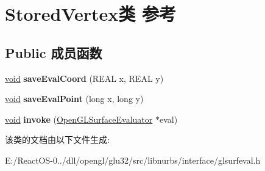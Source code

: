 \hypertarget{class_stored_vertex}{}\section{Stored\+Vertex类 参考}
\label{class_stored_vertex}
\subsection*{Public 成员函数}
\begin{DoxyCompactItemize}
\item 
\mbox{\label{class_stored_vertex_a4041ab67ea70028dae311420c815e690}} 
\hyperlink{interfacevoid}{void} {\bfseries save\+Eval\+Coord} (R\+E\+AL x, R\+E\+AL y)
\item 
\mbox{\label{class_stored_vertex_a0db109a8ccd253a81cfe3cb56f96ab84}} 
\hyperlink{interfacevoid}{void} {\bfseries save\+Eval\+Point} (long x, long y)
\item 
\mbox{\label{class_stored_vertex_a108ed4863a7151ee1ff4e58fa0504f31}} 
\hyperlink{interfacevoid}{void} {\bfseries invoke} (\hyperlink{class_open_g_l_surface_evaluator}{Open\+G\+L\+Surface\+Evaluator} $\ast$eval)
\end{DoxyCompactItemize}


该类的文档由以下文件生成\+:\begin{DoxyCompactItemize}
\item 
E\+:/\+React\+O\+S-\/0../dll/opengl/glu32/src/libnurbs/interface/glsurfeval.\+h\end{DoxyCompactItemize}
